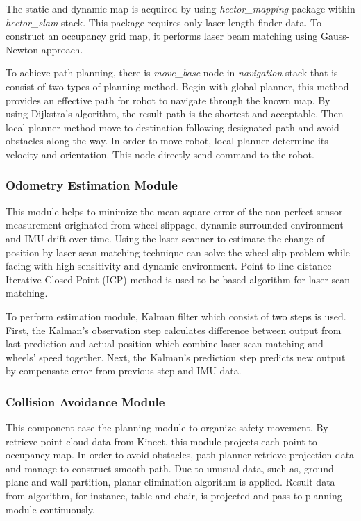 \documentclass{llncs}
\begin{document}
The static and dynamic map is acquired by using \textit{hector\_mapping} package within \textit{hector\_slam} stack. This package requires only laser length finder data. To construct an occupancy grid map, it performs laser beam matching using Gauss-Newton approach\cite{hector_slam}.

To achieve path planning, there is \textit{move\_base} node in \textit{navigation} stack that is consist of two types of planning method. Begin with global planner, this method provides an effective path for robot to navigate through the known map. By using Dijkstra's algorithm, the result path is the shortest and acceptable. Then local planner method move to destination following designated path and avoid obstacles along the way. In order to move robot, local planner determine its velocity and orientation. This node directly send command to the robot.

\subsubsection{Odometry Estimation Module}

This module helps to minimize the mean square error of the non-perfect sensor measurement originated from wheel slippage, dynamic surrounded environment and IMU drift over time. Using the laser scanner to estimate the change of position by laser scan matching technique can solve the wheel slip problem while facing with high sensitivity and dynamic environment. Point-to-line distance Iterative Closed Point (ICP)\cite{icp1}\cite{icp2} method is used to be based algorithm for laser scan matching.

To perform estimation module, Kalman filter which consist of two steps is used. First, the Kalman's observation step calculates difference between output from last prediction and actual position which combine laser scan matching and wheels' speed together. Next, the Kalman's prediction step predicts new output by compensate error from previous step and IMU data.

\subsubsection{Collision Avoidance Module}

This component ease the planning module to organize safety movement. By retrieve point cloud data from Kinect, this module projects each point to occupancy map. In order to avoid obstacles, path planner retrieve projection data and manage to construct smooth path. Due to unusual data, such as, ground plane and wall partition, planar elimination algorithm is applied. Result data from algorithm, for instance, table and chair, is projected and pass to planning module continuously.
\end{document}
